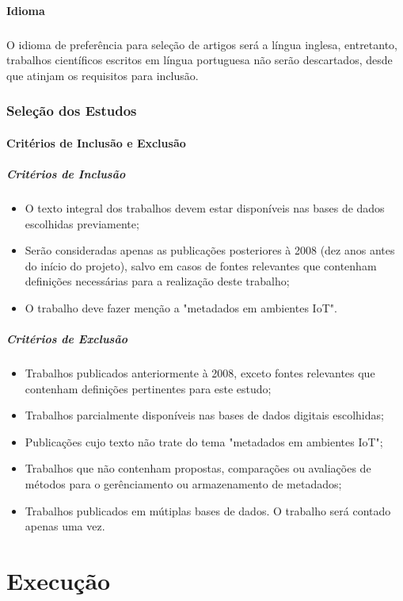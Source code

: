 \paragraph{Idioma}
\subparagraph{}
\quad O idioma de preferência para seleção de artigos será a língua inglesa, entretanto, trabalhos científicos escritos em
língua portuguesa não serão descartados, desde que atinjam os requisitos para inclusão.

\subsubsection{Seleção dos Estudos}
\paragraph{Critérios de Inclusão e Exclusão}
\subparagraph{Critérios de Inclusão}
\begin{itemize}
  \item O texto integral dos trabalhos devem estar disponíveis nas bases de dados escolhidas previamente;
  \item Serão consideradas apenas as publicações posteriores à 2008 (dez anos antes do início do projeto), salvo em casos de fontes relevantes que contenham definições necessárias para a realização deste trabalho;
  \item O trabalho deve fazer menção a "metadados em ambientes \acrlong{IoT}".
\end{itemize}

\subparagraph{Critérios de Exclusão}
\begin{itemize}
  \item Trabalhos publicados anteriormente à 2008, exceto fontes relevantes que contenham definições pertinentes para este estudo;
  \item Trabalhos parcialmente disponíveis nas bases de dados digitais escolhidas;
  \item Publicações cujo texto não trate do tema "metadados em ambientes \acrshort{IoT}";
  \item Trabalhos que não contenham propostas, comparações ou avaliações de métodos para o gerênciamento ou armazenamento de metadados;
  \item Trabalhos publicados em mútiplas bases de dados. O trabalho será contado apenas uma vez.
\end{itemize}

\section{Execução}
